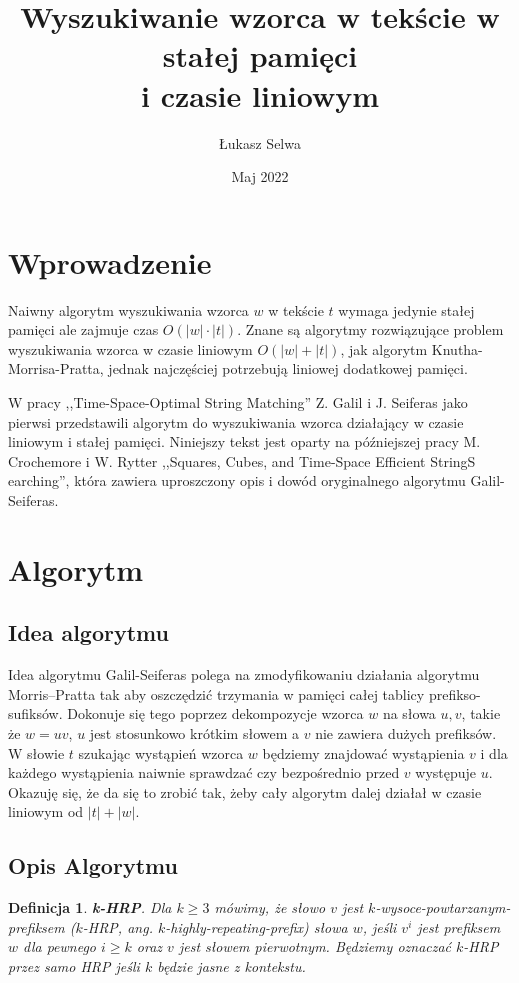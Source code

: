 \documentclass{article}
\title{Wyszukiwanie wzorca w tekście w stałej pamięci\\ i czasie liniowym}
\author{Łukasz Selwa}
\date{Maj 2022}
\newtheorem{definition}{Definicja}[section]
\begin{document}
\maketitle

\section{Wprowadzenie}
Naiwny algorytm wyszukiwania wzorca $w$ w tekście $t$ wymaga jedynie stałej pamięci ale zajmuje czas $O(|w| \cdot |t|)$. 
Znane są algorytmy rozwiązujące problem wyszukiwania wzorca w czasie liniowym $O(|w| + |t|)$, jak algorytm Knutha-Morrisa-Pratta, jednak najczęściej potrzebują liniowej dodatkowej pamięci.


W pracy ,,Time-Space-Optimal String Matching'' Z. Galil i J. Seiferas jako pierwsi przedstawili algorytm do wyszukiwania wzorca działający w czasie liniowym i stałej pamięci.
Niniejszy tekst jest oparty na późniejszej pracy M. Crochemore i W. Rytter ,,Squares, Cubes, and Time-Space Efficient StringS earching'', która zawiera uproszczony opis i dowód oryginalnego algorytmu Galil-Seiferas.

\section{Algorytm}

\subsection{Idea algorytmu}
Idea algorytmu Galil-Seiferas polega na zmodyfikowaniu działania algorytmu Morris–Pratta tak aby oszczędzić trzymania w pamięci całej tablicy prefikso-sufiksów.
Dokonuje się tego poprzez dekompozycje wzorca $w$ na słowa $u,v$, takie że $w = u v$, $u$ jest stosunkowo krótkim słowem a $v$ nie zawiera dużych prefiksów.
W słowie $t$ szukając wystąpień wzorca $w$ będziemy znajdować wystąpienia $v$ i dla każdego wystąpienia naiwnie sprawdzać czy bezpośrednio przed $v$ występuje $u$.
Okazuję się, że da się to zrobić tak, żeby cały algorytm dalej działał w czasie liniowym od $|t| + |w|$.

\subsection{Opis Algorytmu}

\begin{definition}
\textbf{\textit{k-HRP}}.
Dla $k \geq 3$ mówimy, że słowo $v$ jest $k$-wysoce-powtarzanym-prefiksem ($k$-HRP, ang. $k$-\textit{highly-repeating-prefix}) słowa $w$, jeśli $v^i$ jest prefiksem $w$ dla pewnego $i \geq k$ oraz $v$ jest słowem pierwotnym.
Będziemy oznaczać $k$-HRP przez samo HRP jeśli $k$ będzie jasne z kontekstu.
\end{definition}
\end{document}
